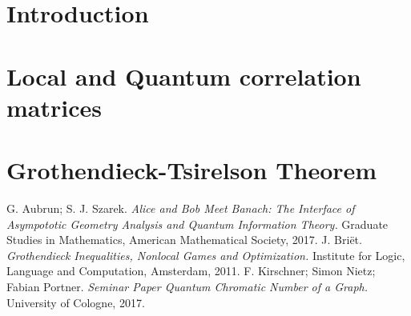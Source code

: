 \let \oldsection \section
\renewcommand{\section}{\vspace{15pt plus 8pt}\oldsection}
\let \oldsubsection \subsection
\renewcommand{\subsection}{\vspace{10pt plus 3pt}\oldsubsection}



\newpage
\section{Introduction} 
	\vspace{8pt}
	


\section{Local and Quantum correlation matrices} 
	\vspace{8pt}

	
\section{Grothendieck-Tsirelson Theorem} 
	
 
 
\appendix

		


%
\newpage 
\begin{thebibliography}{999}
	
	
	 G. Aubrun; S. J. Szarek. {\em Alice and Bob Meet Banach: The Interface of Asympototic Geometry Analysis and Quantum Information Theory.} Graduate Studies in Mathematics, American Mathematical Society, 2017.
	J. Bri\"{e}t. {\em Grothendieck Inequalities, Nonlocal Games and Optimization.} Institute for Logic, Language and Computation, Amsterdam, 2011.
	 F. Kirschner; Simon Nietz; Fabian Portner. {\em Seminar Paper Quantum Chromatic Number of a Graph.} University of Cologne, 2017.
	
	
	
\end{thebibliography}
	
